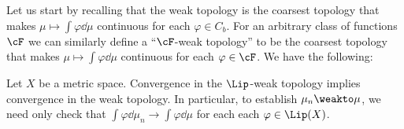 \documentclass[oneside,reqno,letterpaper]{amsart}
\begin{document}
Let us start by recalling that the weak topology is the coarsest topology that makes \(\mu \mapsto \int \varphi \dd \mu\) continuous for each \(\varphi \in C_b\).
For an arbitrary class of functions \(\cF\) we can similarly define a ``\(\cF\)-weak topology'' to be the coarsest topology that makes \(\mu \mapsto \int \varphi \dd \mu\) continuous for each \(\varphi \in \cF\).
We have the following:
\begin{lemma}\label{prop:weak-topology}
  Let \(X\) be a metric space.
  Convergence in the \(\Lip\)-weak topology implies convergence in the weak topology.
  In particular, to establish \(\mu_n \weakto \mu\), we need only check that \(\int \varphi \dd \mu_n \to \int \varphi \dd \mu\) for each each \(\varphi \in \Lip(X)\).
\end{lemma}
\end{document}

